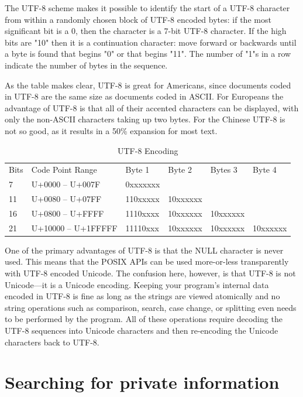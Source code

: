 The UTF-8 scheme makes it possible to identify the start of a UTF-8 character from within a randomly chosen block of UTF-8 encoded bytes: if the most significant bit is a 0, then the character is a 7-bit UTF-8 character. If the high bits are "10" then it is a continuation character: move forward or backwards until a byte is found that begins "0" or that begins "11". The number of "1"s in a row indicate the number of bytes in the sequence.

As the table makes clear, UTF-8 is great for Americans, since documents coded in UTF-8 are the same size as documents coded in ASCII. For Europeans the advantage of UTF-8 is that all of their accented characters can be displayed, with only the non-ASCII characters taking up two bytes. For the Chinese UTF-8 is not so good, as it results in a 50\% expansion for most text.


\begin{table}
\begin{tabular}{llllll}
    Bits &Code Point Range  &  Byte 1 &    Byte 2&    Bytes 3&    Byte 4\\
    7    &U+0000  -- U+007F  & 0xxxxxxx&\\
    11   &U+0080  -- U+07FF  & 110xxxxx&   10xxxxxx&\\
    16   &U+0800  -- U+FFFF  & 1110xxxx&   10xxxxxx&  10xxxxxx&\\
    21   &U+10000 -- U+1FFFFF& 11110xxx&   10xxxxxx&  10xxxxxx&  10xxxxxx\\
\end{tabular}
\caption{UTF-8 Encoding}
\end{table}

One of the primary advantages of UTF-8 is that the NULL character is never used. This means that the POSIX APIs can be used more-or-less transparently with UTF-8 encoded Unicode. The confusion here, however, is that UTF-8 is not Unicode---it is a Unicode encoding. Keeping your program's internal data encoded in UTF-8 is fine as long as the strings are viewed atomically and no string operations such as comparison, search, case change, or splitting even needs to be performed by the program. All of these operations require decoding the UTF-8 sequences into Unicode characters and then re-encoding the Unicode characters back to UTF-8.


\section{Searching for private information}


